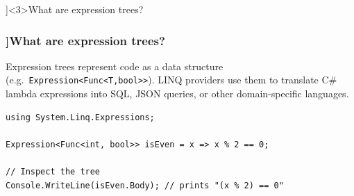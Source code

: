 \QuestionSlide[\CategoryBadge[MetaColor!20]{Metaprogramming}]<3>{What are expression trees?}
\begin{frame}[fragile]
  \frametitle{\AnswerTitle[\CategoryBadge[MetaColor!20]{Metaprogramming}]{What are expression trees?}}

  {\footnotesize
    Expression trees represent code as a data structure (e.g.\ \texttt{Expression<Func<T,bool>>}). LINQ providers use them to translate C\# lambda expressions into SQL, JSON queries, or other domain-specific languages.
  }

  \begin{verbatim}
using System.Linq.Expressions;

Expression<Func<int, bool>> isEven = x => x % 2 == 0;

// Inspect the tree
Console.WriteLine(isEven.Body); // prints "(x % 2) == 0"
  \end{verbatim}
\end{frame}
